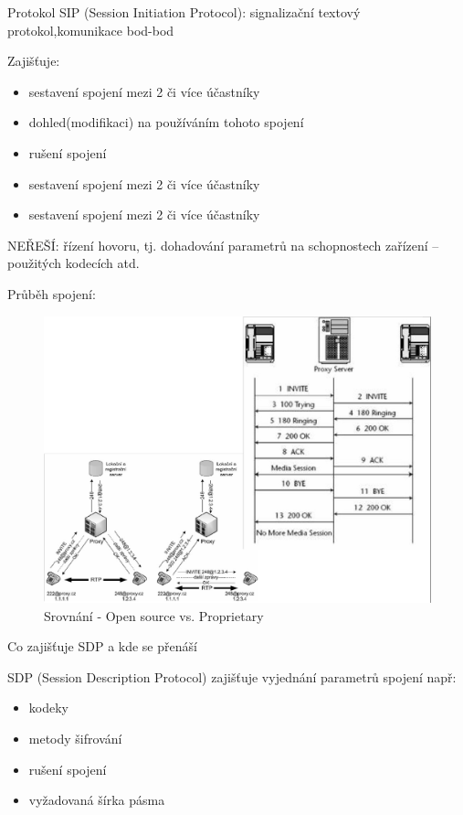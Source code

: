 Protokol SIP (Session Initiation Protocol): signalizační textový protokol,komunikace bod-bod

Zajišťuje:
\begin{itemize}[noitemsep]
    \item sestavení spojení mezi 2 či více účastníky
    \item dohled(modifikaci) na používáním tohoto spojení
    \item rušení spojení
    \item sestavení spojení mezi 2 či více účastníky
    \item sestavení spojení mezi 2 či více účastníky
\end{itemize}
NEŘEŠÍ: řízení hovoru, tj. dohadování parametrů na schopnostech zařízení -- použitých kodecích atd.

Průběh spojení:
\begin{figure}[h!]
    \begin{center}
        \includegraphics[width=\textwidth]{images/otazka26.png}
        \caption{Srovnání - Open source vs. Proprietary}
        \label{img:11}
    \end{center}
\end{figure}

Co zajišťuje SDP a kde se přenáší

SDP (Session Description Protocol) zajišťuje vyjednání parametrů spojení např:
\begin{itemize}[noitemsep]
    \item kodeky
    \item metody šifrování
    \item rušení spojení
    \item vyžadovaná šírka pásma
\end{itemize}

